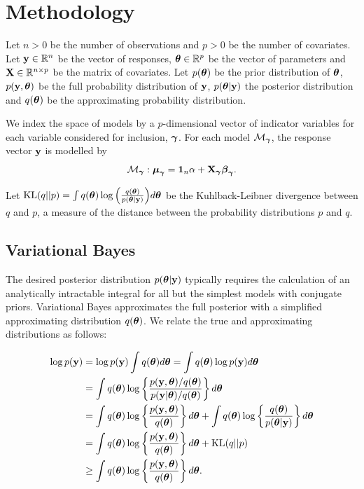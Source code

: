 \documentclass{amsart}[12pt]
\begin{document}
\section{Methodology}
\label{sec:methodology}

Let $n > 0$ be the number of observations and $p > 0$ be the number of covariates. Let ${\bf y} \in {\mathbb{R}}^n$ be the
vector of responses, ${\boldsymbol \theta} \in {\mathbb{R}}^p$ be the vector of parameters and ${\bf X} \in {\mathbb{R}}^{n \times p}$ be the
matrix of covariates. Let $p({\boldsymbol \theta})$ be the prior distribution of ${\boldsymbol \theta}$, $p({\bf y}, {\boldsymbol \theta})$ be the full
probability distribution of ${\bf y}$, $p({\boldsymbol \theta} | {\bf y})$ the posterior distribution and $q({\boldsymbol \theta})$ be the
approximating probability distribution.

We index the space of models by a $p$-dimensional vector of indicator variables for each variable considered 
for inclusion, ${\boldsymbol \gamma}$. For each model $\mathcal{M}_{\boldsymbol \gamma}$, the response vector ${\bf y}$ is modelled by
\begin{equation*}
	\mathcal{M}_{\boldsymbol \gamma}: {\boldsymbol \mu}_{\boldsymbol \gamma} = {\bf 1}_n \alpha + {\bf X}_{\boldsymbol \gamma} {\boldsymbol \beta}_{\boldsymbol \gamma}.
\end{equation*}

Let $\text{KL}(q||p) = \int q({\boldsymbol \theta}) \log{\left( \frac{q({\boldsymbol\theta})}{p({\boldsymbol\theta}|{\bf y})} \right)} d {\boldsymbol \theta}$ be the
Kuhlback-Leibner divergence between $q$ and $p$, a measure of the distance between the probability
distributions $p$ and $q$.

\subsection{Variational Bayes}

The desired posterior distribution $p({\boldsymbol \theta} | {\bf y})$ typically requires the calculation of an analytically
intractable integral for all but the simplest models with conjugate priors. Variational Bayes approximates the
full posterior with a simplified approximating distribution $q({\boldsymbol \theta})$. We relate the true and
approximating distributions as follows:

\begin{align*}
	\log p({\bf y}) & = \log p({\bf y}) \int q({\boldsymbol \theta}) d {\boldsymbol \theta} = \int q({\boldsymbol \theta}) \log p({\bf y}) d {\boldsymbol \theta}                                    \\
	            & = \int q({\boldsymbol \theta}) \log \left\{ \frac{p({\bf y}, {\boldsymbol \theta}) / q({\boldsymbol \theta})}{p({\bf y}|{\boldsymbol \theta}) / q({\boldsymbol \theta})} \right\} d {\boldsymbol \theta} \\
	            & = \int q({\boldsymbol \theta}) \log\left\{ \frac{p({\bf y}, {\boldsymbol \theta})}{q({\boldsymbol \theta})} \right\} d {\boldsymbol \theta} +                              
	\int q({\boldsymbol \theta}) \log\left\{ \frac{q({\boldsymbol \theta})}{p({\boldsymbol \theta}|{\bf y})} \right\} d {\boldsymbol \theta} \\
	            & = \int q({\boldsymbol \theta}) \log\left\{ \frac{p({\bf y}, {\boldsymbol \theta})}{q({\boldsymbol \theta})} \right\} d {\boldsymbol \theta} +                              
	\text{KL}(q||p) \\
	            & \geq \int q({\boldsymbol \theta}) \log\left\{ \frac{p({\bf y}, {\boldsymbol \theta})}{q({\boldsymbol \theta})} \right\} d {\boldsymbol \theta}.                            
\end{align*}
\end{document}
